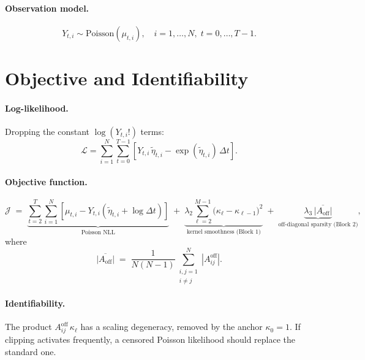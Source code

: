 \documentclass[11pt]{article}
\begin{document}
\paragraph{Observation model.}
\[
Y_{t,i} \sim \mathrm{Poisson}(\mu_{t,i}), \quad i=1,\dots,N,\; t=0,\dots,T-1.
\]

\section{Objective and Identifiability}
\label{sec:objective}

\paragraph{Log-likelihood.}
Dropping the constant \(\log(Y_{t,i}!)\) terms:
\[
\mathcal{L} = \sum_{i=1}^N \sum_{t=0}^{T-1}
\left[ Y_{t,i}\,\tilde{\eta}_{t,i} - \exp(\tilde{\eta}_{t,i})\,\Delta t \right].
\]

\paragraph{Objective function.}
\begin{equation}
\mathcal{J}
\;=\;
\underbrace{\sum_{t=2}^{T}\sum_{i=1}^{N}
\left[\mu_{t,i}-Y_{t,i}\left(\tilde{\eta}_{t,i}+\log\Delta t\right)\right]}_{\text{Poisson NLL}}
\;+\;
\underbrace{\lambda_2 \sum_{\ell=2}^{M-1} \big(\kappa_\ell-\kappa_{\ell-1}\big)^2}_{\text{kernel smoothness (Block~1)}}
\;+\;
\underbrace{\lambda_3\,\overline{|A_{\mathrm{off}}|}}_{\text{off-diagonal sparsity (Block~2)}},
\label{eq:objective}
\end{equation}
where
\begin{equation}
\overline{|A_{\mathrm{off}}|}
\;=\;
\frac{1}{N(N-1)}
\sum_{\substack{i,j=1\\i\neq j}}^{N}|A_{ij}^{\mathrm{off}}|.
\label{eq:l1_offdiag}
\end{equation}

\paragraph{Identifiability.}
The product \(A^{\mathrm{off}}_{ij}\,\kappa_\ell\) has a scaling degeneracy, removed by the anchor \(\kappa_0=1\).
If clipping activates frequently, a censored Poisson likelihood should replace the standard one.
\end{document}
